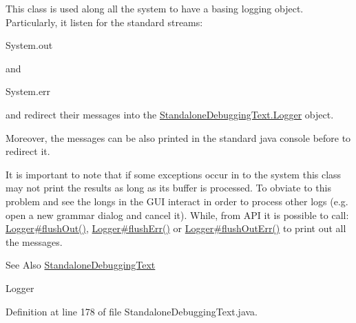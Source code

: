 This class is used along all the system to have a basing logging object. Particularly, it listen for the standard streams\-:
\begin{DoxyCode}
System.out 
\end{DoxyCode}
 and
\begin{DoxyCode}
System.err 
\end{DoxyCode}
 and redirect their messages into the \hyperlink{}{Standalone\-Debugging\-Text.\-Logger} object.\par
 Moreover, the messages can be also printed in the standard java console before to redirect it.\par
 It is important to note that if some exceptions occur in to the system this class may not print the results as long as its buffer is processed. To obviate to this problem and see the longs in the G\-U\-I interact in order to process other logs (e.\-g. open a new grammar dialog and cancel it). While, from A\-P\-I it is possible to call\-: \hyperlink{}{Logger\#flush\-Out()}, \hyperlink{}{Logger\#flush\-Err()} or \hyperlink{}{Logger\#flush\-Out\-Err()} to print out all the messages. 

\begin{DoxySeeAlso}{See Also}
\hyperlink{classit_1_1emarolab_1_1cagg_1_1debugging_1_1StandaloneDebuggingText}{Standalone\-Debugging\-Text} 

Logger 
\end{DoxySeeAlso}


Definition at line 178 of file Standalone\-Debugging\-Text.\-java.



